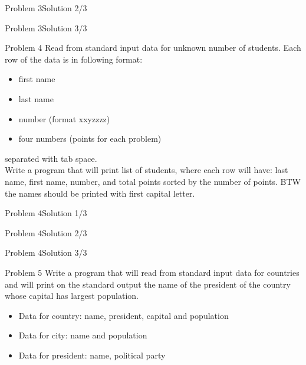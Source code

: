 \begin{frame}[fragile]{Problem 3}{Solution 2/3}

\end{frame}

\begin{frame}[fragile]{Problem 3}{Solution 3/3}

\end{frame}

\begin{frame}{Problem 4}
Read from standard input data for unknown number of students. Each row of the
data is in following format:
\begin{itemize}
  \item first name
  \item last name
  \item number (format xxyzzzz)
  \item four numbers (points for each problem)
\end{itemize}         
     separated with tab space.\\
Write a program that will print list of students, where each row will have: last
name, first name, number, and total points sorted by the number of points. BTW
the names should be printed with first capital letter.
\end{frame}

\begin{frame}[fragile]{Problem 4}{Solution 1/3}

\end{frame}

\begin{frame}[fragile]{Problem 4}{Solution 2/3}

\end{frame}

\begin{frame}[fragile]{Problem 4}{Solution 3/3}

\end{frame}


\begin{frame}{Problem 5}
Write a program that will read from standard input data for countries and will
print on the standard output the name of the president of the country whose
capital has largest population.
\begin{itemize}
  \item Data for country: name, president, capital and population
  \item Data for city: name and population
  \item Data for president: name, political party
\end{itemize}
\end{frame}

